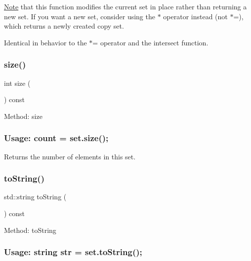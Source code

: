\mbox{\hyperlink{classNote}{Note}} that this function modifies the current set in place rather than returning a new set. If you want a new set, consider using the $\ast$ operator instead (not $\ast$=), which returns a newly created copy set.

Identical in behavior to the $\ast$= operator and the intersect function. \mbox{\label{classstanfordcpplib_1_1collections_1_1GenericSet_af9593d4a5ff4274efaf429cb4f9e57cc}} 
\subsubsection{\texorpdfstring{size()}{size()}}
{\footnotesize\ttfamily int size (\begin{DoxyParamCaption}{ }\end{DoxyParamCaption}) const}



Method\+: size \subsubsection*{Usage\+: count = set.\+size(); }

Returns the number of elements in this set. 

\mbox{\label{classstanfordcpplib_1_1collections_1_1GenericSet_a1fe5121d6528fdea3f243321b3fa3a49}} 
\subsubsection{\texorpdfstring{to\+String()}{toString()}}
{\footnotesize\ttfamily std\+::string to\+String (\begin{DoxyParamCaption}{ }\end{DoxyParamCaption}) const}



Method\+: to\+String \subsubsection*{Usage\+: string str = set.\+to\+String(); }

